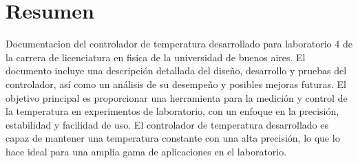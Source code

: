 \thispagestyle{plain}
\chapter[Resumen]{Resumen}
Documentacion del controlador de temperatura desarrollado para laboratorio 4 de la carrera de licenciatura en fisica de la universidad de buenos aires. El documento incluye una descripción detallada del diseño, desarrollo y pruebas del controlador, así como un análisis de su desempeño y posibles mejoras futuras. El objetivo principal es proporcionar una herramienta para la medición y control de la temperatura en experimentos de laboratorio, con un enfoque en la precisión, estabilidad y facilidad de uso. El controlador de temperatura desarrollado es capaz de mantener una temperatura constante con una alta precisión, lo que lo hace ideal para una amplia gama de aplicaciones en el laboratorio.
\label{cp:Resumen}